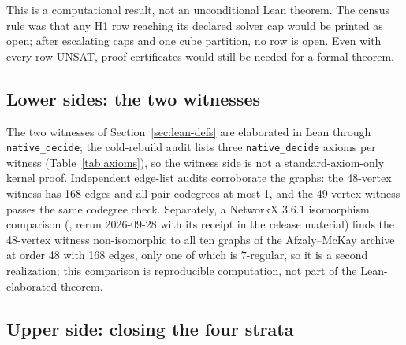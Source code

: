 \documentclass{anvil-paper}
\theoremstyle{definition}
\begin{document}
This is a computational result, not an unconditional Lean theorem. The census rule was that any H1 row reaching its declared solver cap would be printed as open; after escalating caps and one cube partition, no row is open. Even with every row UNSAT, proof certificates would still be needed for a formal theorem.

\subsection{Lower sides: the two witnesses}\label{sec:lower}

The two witnesses of Section~\ref{sec:lean-defs} are elaborated in Lean through \texttt{native\_decide}; the cold-rebuild audit lists three \texttt{native\_decide} axioms per witness (Table~\ref{tab:axioms}), so the witness side is not a standard-axiom-only kernel proof. Independent edge-list audits corroborate the graphs: the 48-vertex witness has 168 edges and all pair codegrees at most 1, and the 49-vertex witness passes the same codegree check. Separately, a NetworkX 3.6.1 isomorphism comparison (, rerun 2026-09-28 with its receipt in the release material) finds the 48-vertex witness non-isomorphic to all ten graphs of the Afzaly--McKay archive \citep{afzaly-mckay-extremal} at order 48 with 168 edges, only one of which is 7-regular, so it is a second realization; this comparison is reproducible computation, not part of the Lean-elaborated theorem.

\subsection{Upper side: closing the four strata}\label{sec:upper}
\end{document}
